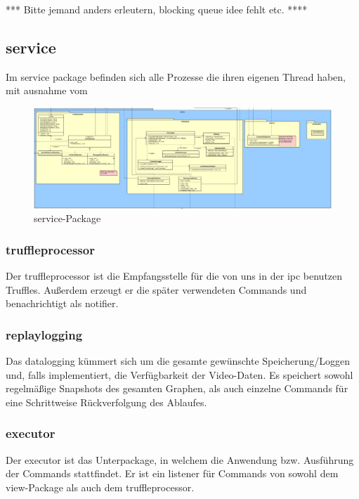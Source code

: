       *** Bitte jemand anders erleutern, blocking queue idee fehlt etc. ****


\subsection{service}
\label{subsec:service}

Im service package befinden sich alle Prozesse die ihren eigenen Thread haben,
mit ausnahme vom

\begin{figure}[H]
  \centering
  \includegraphics[width=\textwidth]{../diagramimages/service.png}
  \caption{service-Package}
  \medskip
\end{figure}

    \subsubsection{truffleprocessor}
    \label{subsubsec:truffleprocessor}
    Der truffleprocessor ist die Empfangsstelle für die von uns in der
    \gls{ipc} benutzen Truffles. Außerdem erzeugt er die später verwendeten
    Commands und benachrichtigt als \gls{notifier}.

    \subsubsection{replaylogging}
    \label{subsubsec:replaylogging}
    Das datalogging kümmert sich um die gesamte gewünschte
    Speicherung/Loggen und, falls implementiert, die Verfügbarkeit der
    Video-Daten. Es speichert sowohl regelmäßige Snapshots des gesamten
    Graphen, als auch einzelne Commands für eine Schrittweise Rückverfolgung
    des Ablaufes.

    \subsubsection{executor}
    \label{subsubsec:executor}
    Der executor ist das Unterpackage, in welchem die Anwendung bzw.
    Ausführung der Commands stattfindet. Er ist ein \gls{listener} für Commands
    von sowohl dem view-Package als auch dem truffleprocessor.



